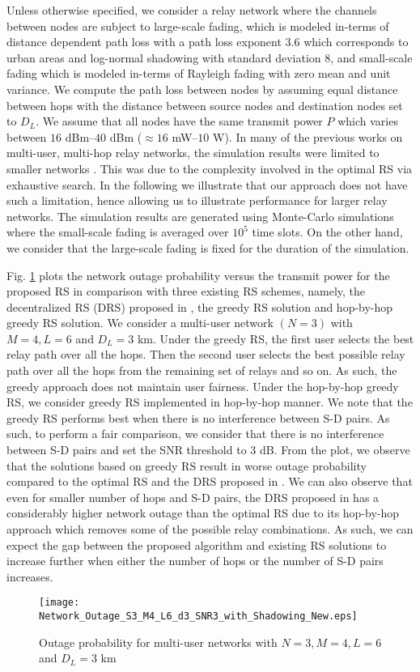 \documentclass[12pt,draftclsnofoot,onecolumn]{IEEEtran}
\begin{document}
	Unless otherwise specified, we consider a relay network where the channels between nodes are subject to large-scale fading, which is modeled in-terms of distance dependent path loss with a path loss exponent $3.6$ which corresponds to urban areas \cite{pathLossExponent} and log-normal shadowing with standard deviation $8$, and small-scale fading which is modeled in-terms of Rayleigh fading with zero mean and unit variance. We compute the path loss between nodes by assuming equal distance between hops with the distance between source nodes and destination nodes set to $D_L$. We assume that all nodes have the same transmit power $P$ which varies between $16$ dBm--$40$ dBm ($\approx 16$ mW--$10$ W). In many of the previous works on multi-user, multi-hop relay networks, the simulation results were limited to smaller networks \cite{2809748}. This was due to the complexity involved in the optimal RS via exhaustive search. In the following we illustrate that our approach does not have such a limitation, hence allowing us to illustrate performance for larger relay networks. The simulation results are generated using Monte-Carlo simulations where the small-scale fading is averaged over $10^5$ time slots. On the other hand, we consider that the large-scale fading is fixed for the duration of the simulation.
	
	Fig. \ref{figure6} plots the network outage probability versus the transmit power for the proposed RS in comparison with three existing RS schemes, namely, the decentralized RS (DRS) proposed in \cite{2809748}, the greedy RS solution and hop-by-hop greedy RS solution. We consider a multi-user network $(N = 3)$ with $M = 4, L = 6$ and $D_L = 3$ km. Under the greedy RS, the first user selects the best relay path over all the hops. Then the second user selects the best possible relay path over all the hops from the remaining set of relays and so on. As such, the greedy approach does not maintain user fairness. Under the hop-by-hop greedy RS, we consider greedy RS implemented in hop-by-hop manner. We note that the greedy RS performs best when there is no interference between S-D pairs. As such, to perform a fair comparison, we consider that there is no interference between S-D pairs and set the SNR threshold to $3$ dB. From the plot, we observe that the solutions based on greedy RS result in worse outage probability compared to the optimal RS and the DRS proposed in \cite{2809748}. We can also observe that even for smaller number of hops and S-D pairs, the DRS proposed in \cite{2809748} has a considerably higher network outage than the optimal RS due to its hop-by-hop approach which removes some of the possible relay combinations. As such, we can expect the gap between the proposed algorithm and existing RS solutions to increase further when either the number of hops or the number of S-D pairs increases.
	\begin{figure}
		\centering
		\texttt{[image: Network\_Outage\_S3\_M4\_L6\_d3\_SNR3\_with\_Shadowing\_New.eps]}
		\centering\caption{Outage probability for multi-user networks with $N=3, M=4, L=6$ and $D_L=3$ km}
		\label{figure6}
	\end{figure}
	
\end{document}
